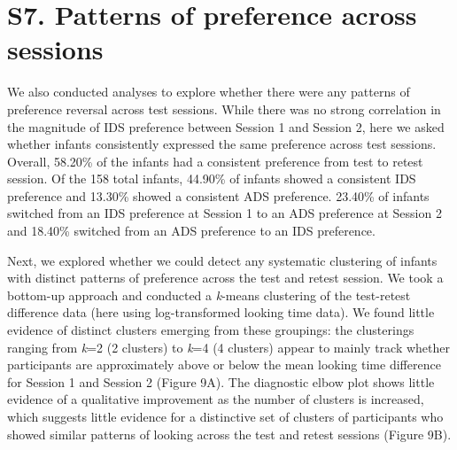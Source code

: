 \documentclass[
  english,
  man, donotrepeattitle,floatsintext]{apa6}
\begin{document}
\newpage

\hypertarget{s7.-patterns-of-preference-across-sessions}{%
\section{S7. Patterns of preference across sessions}\label{s7.-patterns-of-preference-across-sessions}}

We also conducted analyses to explore whether there were any patterns of preference reversal across test sessions.
While there was no strong correlation in the magnitude of IDS preference between Session 1 and Session 2, here we asked whether infants consistently expressed the same preference across test sessions.
Overall, 58.20\% of the infants had a consistent preference from test to retest session.
Of the 158 total infants, 44.90\% of infants showed a consistent IDS preference and 13.30\% showed a consistent ADS preference.
23.40\% of infants switched from an IDS preference at Session 1 to an ADS preference at Session 2 and 18.40\% switched from an ADS preference to an IDS preference.

Next, we explored whether we could detect any systematic clustering of infants with distinct patterns of preference across the test and retest session.
We took a bottom-up approach and conducted a \emph{k}-means clustering of the test-retest difference data (here using log-transformed looking time data).
We found little evidence of distinct clusters emerging from these groupings: the clusterings ranging from \emph{k}=2 (2 clusters) to \emph{k}=4 (4 clusters) appear to mainly track whether participants are approximately above or below the mean looking time difference for Session 1 and Session 2 (Figure 9A).
The diagnostic elbow plot shows little evidence of a qualitative improvement as the number of clusters is increased, which suggests little evidence for a distinctive set of clusters of participants who showed similar patterns of looking across the test and retest sessions (Figure 9B).
\end{document}
